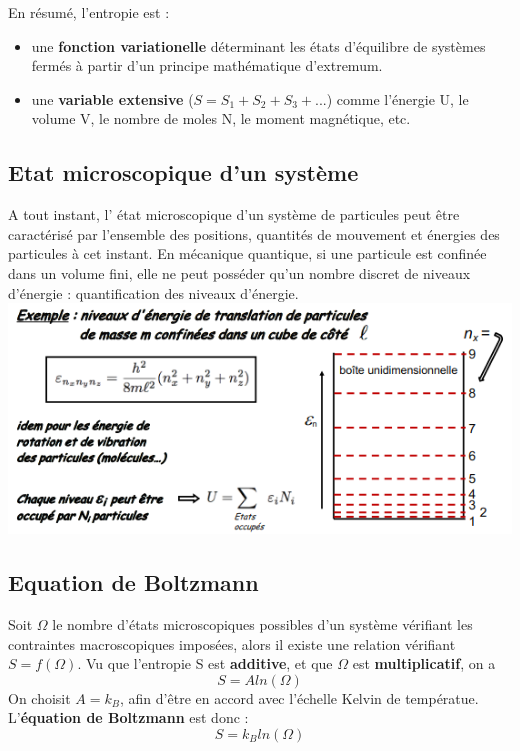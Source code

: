 \documentclass{article}
\begin{document}
            En résumé, l'entropie est : 
            \begin{itemize}
                \item une \textbf{fonction variationelle} déterminant les états d’équilibre de
                systèmes fermés à partir d’un principe mathématique d’extremum.
                \item une \textbf{variable extensive} ($S=S_1 +S_2 +S_3 +...$) comme l’énergie U,
                le volume V, le nombre de moles N, le moment magnétique, etc.
            \end{itemize}
        
        \subsection{Etat microscopique d'un système}
            A tout instant, l’ état microscopique d'un système de particules peut
            être caractérisé par l'ensemble des positions, quantités de mouvement
            et énergies des particules à cet instant.
            En mécanique quantique, si une particule est confinée dans un volume fini,
            elle ne peut posséder qu'un nombre discret de niveaux d'énergie : quantification des niveaux d’énergie.\\
            \includegraphics[scale=.8]{niveaux_d_energie.png}


        \subsection{Equation de Boltzmann}
            Soit $\Omega$ le nombre d'états microscopiques possibles d'un système vérifiant les contraintes macroscopiques imposées,
            alors il existe une relation vérifiant $S = f(\Omega)$.
            Vu que l'entropie S est \textbf{additive}, et que $\Omega$ est \textbf{multiplicatif}, on a 
            $$
            S = A ln(\Omega)
            $$
            On choisit $A = k_B$, afin d'être en accord avec l'échelle Kelvin de températue.
            L'\textbf{équation de Boltzmann} est donc :
            $$
            S = k_B ln(\Omega)
            $$
        
\end{document}
